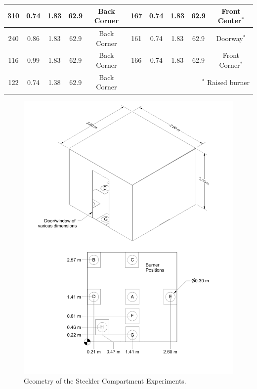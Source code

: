 \begin{table}
\begin{center}
\begin{tabular}{|c|c|c|c|c||c|c|c|c|c|}
310     & 0.74      & 1.83          &  62.9      & Back Corner  & 167   & 0.74      & 1.83        &  62.9         & Front Center$^*$    \\ \hline
240     & 0.86      & 1.83          &  62.9      & Back Corner  & 161   & 0.74      & 1.83        &  62.9         & Doorway$^*$         \\ \hline
116     & 0.99      & 1.83          &  62.9      & Back Corner  & 166   & 0.74      & 1.83        &  62.9         & Front Corner$^*$    \\ \hline
122     & 0.74      & 1.38          &  62.9      & Back Corner  &  \multicolumn{5}{r|}{$^*$ Raised burner}                   \\ \hline
\end{tabular}
\end{center}
\label{Steckler_Table}
\end{table}

\begin{figure}[p]
\includegraphics[width=\textwidth]{FIGURES/Steckler_Compartment/Steckler_Room_Drawing.png}
\caption{Geometry of the Steckler Compartment Experiments.}
\label{Steckler_ Drawing}
\end{figure}

